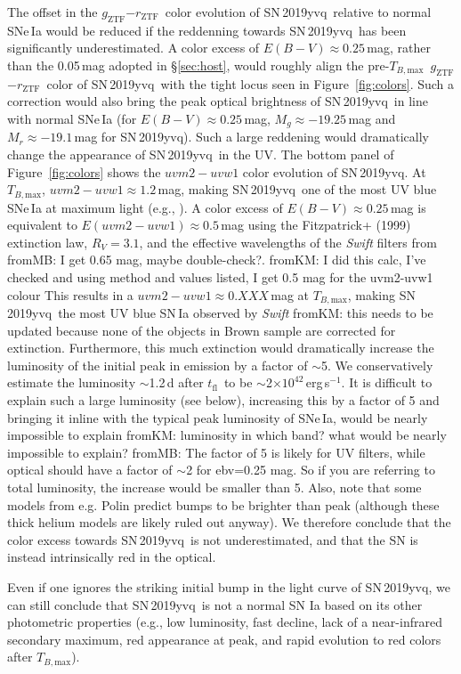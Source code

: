 \documentclass[twocolumn]{aastex63}
\newcommand{\fromkate}[1]{{\color{brown} fromKM: {#1}}}
\newcommand{\frommb}[1]{{\color{purple} fromMB: {#1}}}
\newcommand{\rztf}{$r_\mathrm{ZTF}$}
\newcommand{\gztf}{$g_\mathrm{ZTF}$}
\newcommand{\tfl}{$t_\mathrm{fl}$}
\newcommand{\tbmax}{$T_{B,\mathrm{max}}$}
\newcommand{\sn}{SN\,2019yvq}
\begin{document}
The offset in the \gztf$ - $\rztf\ color evolution of \sn\ relative to normal
SNe\,Ia would be reduced if the reddenning towards \sn\ has been
significantly underestimated. A color excess of $E(B-V) \approx 0.25$\,mag,
rather than the 0.05\,mag adopted in \S\ref{sec:host}, would roughly align
the pre-\tbmax\ \gztf$ - $\rztf\ color of \sn\ with the tight locus seen in
Figure~\ref{fig:colors}. Such a correction would also bring the peak optical
brightness of \sn\ in line with normal SNe\,Ia (for $E(B-V) \approx
0.25$\,mag, $M_g \approx -19.25$\,mag and $M_r \approx -19.1$\,mag for \sn).
Such a large reddening would dramatically change the appearance of \sn\ in
the UV. The bottom panel of Figure~\ref{fig:colors} shows the $uvm2 - uvw1$
color evolution of \sn. At \tbmax, $uvm2 - uvw1 \approx 1.2$\,mag, making
\sn\ one of the most UV blue SNe\,Ia at maximum light (e.g.,
\citealt{Milne10,Brown17}). A color excess of $E(B-V)
\approx 0.25$\,mag is equivalent to $E(uvm2 - uvw1)
\approx 0.5$\,mag using the Fitzpatrick+ (1999) extinction law, $R_V = 3.1$, and the effective wavelengths of the \textit{Swift} filters from \citet{Brown17} \frommb{I get 0.65 mag, maybe double-check?}. \fromkate{I did this calc, I've checked and using method and values listed, I get 0.5 mag for the uvm2-uvw1 colour} This results in a $uvm2 - uvw1 \approx 0.XXX$\,mag at \tbmax,
making \sn\ the most UV blue SN\,Ia observed by \textit{Swift} \fromkate{this needs to be updated because none of the objects in Brown sample are corrected for extinction}. Furthermore,
this much extinction would dramatically increase the luminosity of the initial
peak in emission by a factor of $\sim$5. We conservatively estimate the
luminosity $\sim$1.2\,d after \tfl\ to be $\sim$2$\times
10^{42}$\,erg\,s$^{-1}$. It is difficult to explain such a large luminosity
(see below), increasing this by a factor of 5 and bringing it inline with the
typical peak luminosity of SNe\,Ia, would be nearly impossible to explain \fromkate{luminosity in which band? what would be nearly impossible to explain?} \frommb{The factor of 5 is likely for UV filters, while optical should have a factor of $\sim$2 for ebv=0.25 mag. So if you are referring to total luminosity, the increase would be smaller than 5. Also, note that some models from e.g. Polin predict bumps to be brighter than peak (although these thick helium models are likely ruled out anyway)}. We
therefore conclude that the color excess towards \sn\ is not underestimated,
and that the SN is instead intrinsically red in the optical.

Even if one ignores the striking initial bump in the light curve of \sn, we
can still conclude that \sn\ is not a normal SN Ia based on its other
photometric properties (e.g., low luminosity, fast decline, lack of a
near-infrared secondary maximum, red appearance at peak, and rapid evolution
to red colors after \tbmax).
\end{document}
